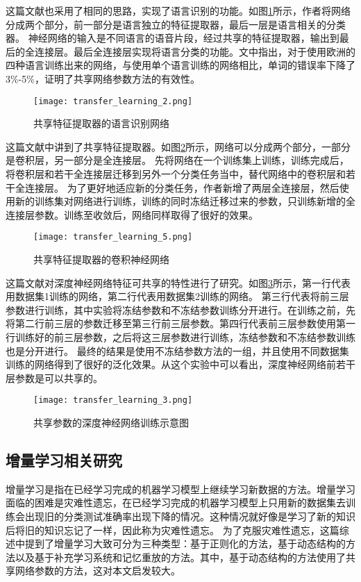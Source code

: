 这篇文献\cite{6639081}也采用了相同的思路，实现了语言识别的功能。如图\ref{fig:transfer_learning_2}所示，作者将网络分成两个部分，前一部分是语言独立的特征提取器，最后一层是语言相关的分类器。
神经网络的输入是不同语言的语音片段，经过共享的特征提取器，输出到最后的全连接层。最后全连接层实现将语言分类的功能。文中指出，对于使用欧洲的四种语言训练出来的网络，与使用单个语言训练的网络相比，单词的错误率下降了3\%-5\%，证明了共享网络参数方法的有效性。
\begin{figure}
    \centering
    \texttt{[image: transfer\_learning\_2.png]}
    \caption{共享特征提取器的语言识别网络\cite{6639081}}
    \label{fig:transfer_learning_2}
\end{figure}

这篇文献\cite{Oquab_2014_CVPR}中讲到了共享特征提取器。如图\ref{fig:transfer_learning_5}所示，网络可以分成两个部分，一部分是卷积层，另一部分是全连接层。
先将网络在一个训练集上训练，训练完成后，将卷积层和若干全连接层迁移到另外一个分类任务当中，替代网络中的卷积层和若干全连接层。
为了更好地适应新的分类任务，作者新增了两层全连接层，然后使用新的训练集对网络进行训练，训练的同时冻结迁移过来的参数，只训练新增的全连接层参数。训练至收敛后，网络同样取得了很好的效果。 
\begin{figure}
    \centering
    \texttt{[image: transfer\_learning\_5.png]}
    \caption{共享特征提取器的卷积神经网络\cite{Oquab_2014_CVPR}}
    \label{fig:transfer_learning_5}
\end{figure}

这篇文献\cite{yosinski_2014_NIPS}对深度神经网络特征可共享的特性进行了研究。如图\ref{fig:transfer_learning_3}所示，第一行代表用数据集1训练的网络，第二行代表用数据集2训练的网络。
第三行代表将前三层参数进行训练，其中实验将冻结参数和不冻结参数训练分开进行。在训练之前，先将第二行前三层的参数迁移至第三行前三层参数。第四行代表前三层参数使用第一行训练好的前三层参数，之后将这三层参数进行训练，冻结参数和不冻结参数训练也是分开进行。
最终的结果是使用不冻结参数方法的一组，并且使用不同数据集训练的网络得到了很好的泛化效果。从这个实验中可以看出，深度神经网络前若干层参数是可以共享的。
\begin{figure}
    \centering
    \texttt{[image: transfer\_learning\_3.png]}
    \caption{共享参数的深度神经网络训练示意图\cite{yosinski_2014_NIPS}}
    \label{fig:transfer_learning_3}
\end{figure}

\subsection{增量学习相关研究}
增量学习是指在已经学习完成的机器学习模型上继续学习新数据的方法。增量学习面临的困难是灾难性遗忘，在已经学习完成的机器学习模型上只用新的数据集去训练会出现旧的分类测试准确率出现下降的情况。这种情况就好像是学习了新的知识后将旧的知识忘记了一样，因此称为灾难性遗忘。
为了克服灾难性遗忘，这篇综述\cite{PARISI201954}中提到了增量学习大致可分为三种类型：基于正则化的方法，基于动态结构的方法以及基于补充学习系统和记忆重放的方法。其中，基于动态结构的方法使用了共享网络参数的方法，这对本文启发较大。

